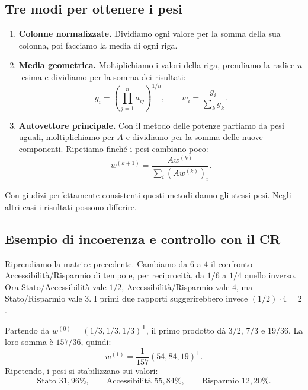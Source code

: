 \subsection*{Tre modi per ottenere i pesi}

\begin{enumerate}
    \item \textbf{Colonne normalizzate.} Dividiamo ogni valore
        per la somma della sua colonna, poi facciamo la media di ogni riga.
    \item \textbf{Media geometrica.} Moltiplichiamo i valori della riga,
        prendiamo la radice $n$-esima e dividiamo per la somma dei risultati:
        \[
            g_i=\left(\prod_{j=1}^n a_{ij}\right)^{1/n},
            \qquad w_i=\frac{g_i}{\sum_k g_k}.
        \]
    \item \textbf{Autovettore principale.} Con il metodo delle potenze
        partiamo da pesi uguali, moltiplichiamo per $A$ e dividiamo
        per la somma delle nuove componenti. Ripetiamo finché i pesi
        cambiano poco:
        \[
            w^{(k+1)}=\frac{Aw^{(k)}}{\sum_i(Aw^{(k)})_i}.
        \]
\end{enumerate}

\noindent Con giudizi perfettamente consistenti questi metodi danno
gli stessi pesi. Negli altri casi i risultati possono differire.

\subsection*{Esempio di incoerenza e controllo con il CR}

\noindent Riprendiamo la matrice precedente. Cambiamo da $6$ a $4$
il confronto Accessibilità/Risparmio di tempo e, per reciprocità,
da $1/6$ a $1/4$ quello inverso. Ora Stato/Accessibilità vale $1/2$,
Accessibilità/Risparmio vale $4$, ma Stato/Risparmio vale $3$.
I primi due rapporti suggerirebbero invece $(1/2)\cdot 4=2$.

\noindent Partendo da $w^{(0)}=(1/3,1/3,1/3)^{\mathsf{T}}$,
il primo prodotto dà $3/2$, $7/3$ e $19/36$.
La loro somma è $157/36$, quindi:
\[
    w^{(1)}=\frac{1}{157}(54,84,19)^{\mathsf{T}}.
\]
\noindent Ripetendo, i pesi si stabilizzano sui valori:
\[
    \text{Stato }31{,}96\%,\qquad
    \text{Accessibilità }55{,}84\%,\qquad
    \text{Risparmio }12{,}20\%.
\]

